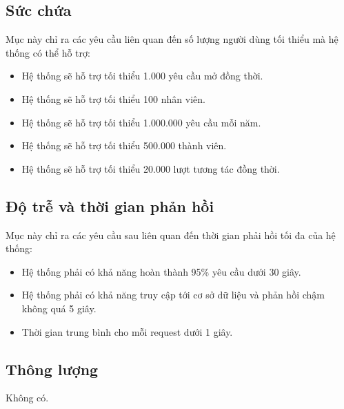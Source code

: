 \documentclass[./../main_file.tex]{subfiles}
\begin{document}
	\subsection{Sức chứa}
	
	Mục này chỉ ra các yêu cầu liên quan đến số lượng người dùng tối thiểu mà hệ thống có thể hỗ trợ:
	
	\begin{itemize}
		\item Hệ thống sẽ hỗ trợ tối thiểu 1.000 yêu cầu mở đồng thời.
		\item Hệ thống sẽ hỗ trợ tối thiểu 100 nhân viên.
		\item Hệ thống sẽ hỗ trợ tối thiểu 1.000.000 yêu cầu mỗi năm.
		\item Hệ thống sẽ hỗ trợ tối thiểu 500.000 thành viên.
		\item Hệ thống sẽ hỗ trợ tối thiểu 20.000 lượt tương tác đồng thời.
	\end{itemize}
	
	\subsection{Độ trễ và thời gian phản hồi}
	
	Mục này chỉ ra các yêu cầu sau liên quan đến thời gian phải hồi tối đa của hệ thống:
	\begin{itemize}
		\item 	Hệ thống phải có khả năng hoàn thành 95\% yêu cầu dưới 30 giây.
		\item Hệ thống phải có khả năng truy cập tới cơ sở dữ liệu và phản hồi chậm không quá 5 giây.
		\item Thời gian trung bình cho mỗi request dưới 1 giây.
	\end{itemize}

	\subsection{Thông lượng}
	Không có.
\end{document}
